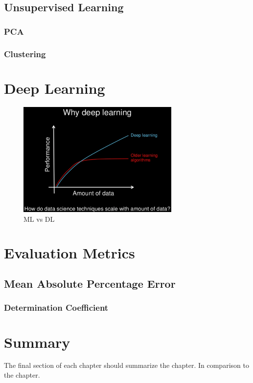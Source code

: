 \subsection{Unsupervised Learning}
\subsubsection{PCA}
\subsubsection{Clustering}


\section{Deep Learning}
\label{s:Second-Background-Deep-Learning}

\begin{figure}[h]
\centering
\includegraphics[width=8cm]{figures/Ch2/MlvsDL-data-amount.png}
\caption{ML vs DL}
\label{f:ML-vs-DL}
\end{figure}

\section{Evaluation Metrics}
\label{sec:section_Example}
\subsection{Mean Absolute Percentage Error}
\subsubsection{Determination Coefficient}

\section{Summary}
\label{s:Background-Summary}

The final section of each chapter should summarize the chapter. In comparison to the chapter.

